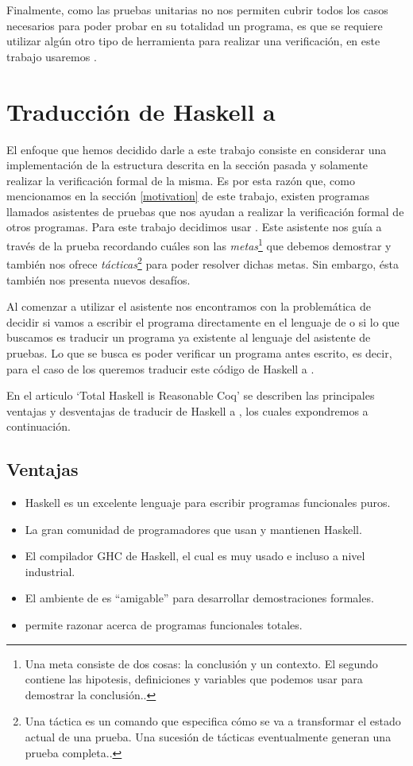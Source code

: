 Finalmente, como las pruebas unitarias no nos permiten cubrir todos los casos necesarios para poder probar en su totalidad un programa, es que se requiere utilizar algún otro tipo de herramienta para realizar una verificaci\'on, en este trabajo usaremos {\coq}.



\section{Traducción de Haskell a {\coq}}
El enfoque que hemos decidido darle a este trabajo consiste en considerar una implementaci\'on de 
la estructura descrita en la secci\'on pasada y solamente realizar la verificaci\'on formal de la 
misma. Es por esta raz\'on que, como mencionamos en la secci\'on \ref{motivation} de este trabajo, 
existen programas llamados asistentes de pruebas que nos ayudan a realizar la verificaci\'on formal 
de otros programas. Para este trabajo decidimos usar {\coq}. Este asistente nos gu\'ia a través de 
la prueba recordando cu\'ales son las \textit{metas}\footnote{Una meta consiste de dos cosas: la 
conclusi\'on y un contexto. El segundo contiene las hipotesis, definiciones y variables que podemos 
usar para demostrar la conclusi\'on.\cite{GOALS}.} que debemos demostrar y tambi\'en nos ofrece 
\textit{t\'acticas}\footnote{Una táctica es un comando que especifica c\'omo se va a transformar el 
estado actual de una prueba. Una sucesión de tácticas eventualmente generan una prueba 
completa.\cite{TACTICS}.} para poder resolver dichas metas. Sin embargo, \'esta tambi\'en nos presenta 
nuevos desaf\'ios.

Al comenzar a utilizar el asistente nos encontramos con la problem\'atica de decidir si vamos a 
escribir el programa directamente en el lenguaje de {\coq} o si lo que buscamos es traducir un 
programa ya existente al lenguaje del asistente de pruebas. Lo que se busca es poder verificar un 
programa antes escrito, es decir, para el caso de los {\arns} queremos traducir este código de 
Haskell a {\coq}.

En el articulo `Total Haskell is Reasonable Coq' \cite{thrc} se describen las principales ventajas
y desventajas de traducir de Haskell a {\coq}, los cuales expondremos a continuaci\'on.

\subsection{Ventajas}
\begin{itemize}
    \item Haskell es un excelente lenguaje para escribir programas funcionales puros.
    \item La gran comunidad de programadores que usan y mantienen Haskell.
    \item El compilador GHC de Haskell, el cual es muy usado e incluso a nivel industrial.
    \item El ambiente de {\coq} es ``amigable'' para desarrollar demostraciones formales.
    \item {\coq} permite razonar acerca de programas funcionales totales.
\end{itemize}

